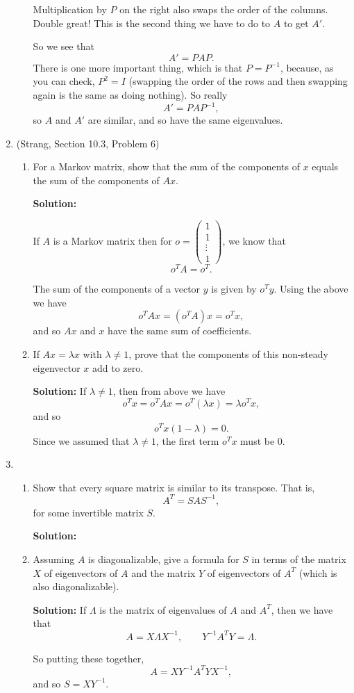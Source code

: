 \documentclass[11pt]{article}
\begin{document}
\begin{enumerate}
\begin{enumerate}
Multiplication by $P$ on the right also swaps the order of the columns.  Double great!  This is the second thing we have to do to $A$ to get $A'$.

So we see that 
\[A' = PAP. \]
There is one more important thing, which is that $P=P^{-1}$, because, as you can check, $P^2 = I$ (swapping the order of the rows and then swapping again is the same as doing nothing).  So really
\[A' = P A P^{-1}, \]
so $A$ and $A'$ are similar, and so have the same eigenvalues.


\end{enumerate}

\item (Strang, Section 10.3, Problem 6)  
\begin{enumerate}
\item For a Markov matrix, show that the sum of the components of $x$ equals the sum of the components of $Ax$.

\textbf{Solution:}

If $A$ is a Markov matrix then for $o = \begin{pmatrix} 1 \\ 1 \\ \vdots \\ 1 \end{pmatrix}$, we know that 
\[o^T A = o^T. \]

The sum of the components of a vector $y$ is given by $o^T y$.  Using the above we have
\[o^T Ax = (o^TA)x = o^Tx, \] 
and so $Ax$ and $x$ have the same sum of coefficients.

\item If $Ax =  \lambda x$ with $\lambda \neq 1$, prove that the components of this non-steady eigenvector $x$ add to zero.

\textbf{Solution:} If $\lambda \neq 1$, then from above we have
\[ o^Tx = o^TAx = o^T(\lambda x) = \lambda o^T x,\]
and so
\[o^Tx(1-\lambda) = 0.\]
Since we assumed that $\lambda \neq 1$, the first term $o^Tx$ must be $0$.
\end{enumerate}


\item 

\begin{enumerate}
\item Show that every square matrix is similar to its transpose.  That is, 
\[A^T=SAS^{-1}, \] 
for some invertible matrix $S$.

\textbf{Solution:} 

\item Assuming $A$ is diagonalizable, give a formula for $S$ in terms of the matrix $X$ of eigenvectors of $A$ and the matrix $Y$ of eigenvectors of $A^T$ (which is also diagonalizable).

\textbf{Solution:} If $\Lambda$ is the matrix of eigenvalues of $A$ and $A^{T}$, then we have that
\[ A =  X\Lambda X^{-1}, \qquad Y^{-1} A^T Y = \Lambda.\]

So putting these together,
\[ A = X Y^{-1} A^T Y X^{-1}, \]
and so $S = XY^{-1}$.

\end{enumerate}


\end{enumerate}
\end{document}
